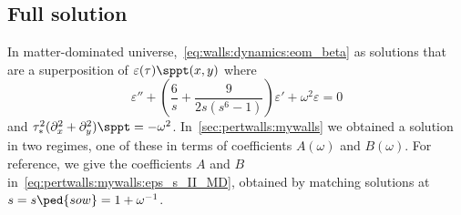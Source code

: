





\subsection{Full solution}\label{app:walls:dynamics:full_A_B}
    In matter-dominated universe,~\cref{eq:walls:dynamics:eom_beta} as solutions that are a superposition of $ \varepsilon(\tau) \sppt(x,y)$ where
    \begin{equation}\label{eq:walls:dynamics:eom_eps_s_MD}
        \varepsilon'' + \left( \frac{6}{s}  +\frac{9}{2s\left(s^6-1\right)} \right) \varepsilon' + \omega^2 \varepsilon = 0
    \end{equation}
    and $\tau_\ast^2(\partial_x^2 + \partial_y^2)\sppt= -\omega^2 $. %
    In~\cref{sec:pertwalls:mywalls} we obtained a solution in two regimes, one of these in terms of coefficients $A(\omega)$ and $B(\omega)$. %
    For reference, we give the coefficients $A$ and $B$ in~\cref{eq:pertwalls:mywalls:eps_s_II_MD}, obtained by matching solutions at $s=s\ped{sow}=1+\omega^{-1}$. 

